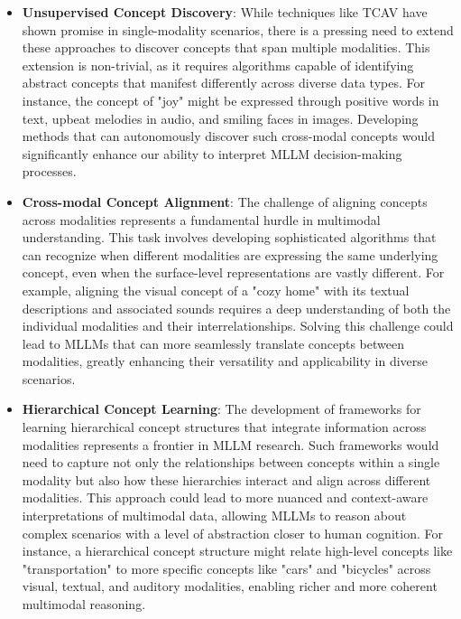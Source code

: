 \begin{itemize}
    \item \textbf{Unsupervised Concept Discovery}: While techniques like TCAV \citep{kim2018interpretability} have shown promise in single-modality scenarios, there is a pressing need to extend these approaches to discover concepts that span multiple modalities. This extension is non-trivial, as it requires algorithms capable of identifying abstract concepts that manifest differently across diverse data types. For instance, the concept of "joy" might be expressed through positive words in text, upbeat melodies in audio, and smiling faces in images. Developing methods that can autonomously discover such cross-modal concepts would significantly enhance our ability to interpret MLLM decision-making processes.
    
    \item \textbf{Cross-modal Concept Alignment}: The challenge of aligning concepts across modalities represents a fundamental hurdle in multimodal understanding. This task involves developing sophisticated algorithms that can recognize when different modalities are expressing the same underlying concept, even when the surface-level representations are vastly different. For example, aligning the visual concept of a "cozy home" with its textual descriptions and associated sounds requires a deep understanding of both the individual modalities and their interrelationships. Solving this challenge could lead to MLLMs that can more seamlessly translate concepts between modalities, greatly enhancing their versatility and applicability in diverse scenarios.
    
    \item \textbf{Hierarchical Concept Learning}: The development of frameworks for learning hierarchical concept structures that integrate information across modalities represents a frontier in MLLM research. Such frameworks would need to capture not only the relationships between concepts within a single modality but also how these hierarchies interact and align across different modalities. This approach could lead to more nuanced and context-aware interpretations of multimodal data, allowing MLLMs to reason about complex scenarios with a level of abstraction closer to human cognition. For instance, a hierarchical concept structure might relate high-level concepts like "transportation" to more specific concepts like "cars" and "bicycles" across visual, textual, and auditory modalities, enabling richer and more coherent multimodal reasoning.
\end{itemize}

